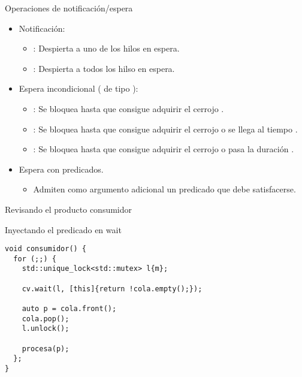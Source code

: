 \begin{frame}{Operaciones de notificación/espera}
\begin{itemize}
  \item Notificación:
    \begin{itemize}
      \item {}: Despierta a uno de los hilos en espera.
      \item {}: Despierta a todos los hilso en espera.
    \end{itemize}
  \item Espera incondicional ( de tipo ):
    \begin{itemize}
      \item {}: Se bloquea hasta que consigue adquirir el cerrojo .
      \item {}: Se bloquea hasta que consigue adquirir el cerrojo  o se llega al tiempo .
      \item {}: Se bloquea hasta que consigue adquirir el cerrojo  o pasa la duración .
    \end{itemize}
  \item Espera con predicados.
    \begin{itemize}
      \item Admiten como argumento adicional un predicado que debe satisfacerse.
    \end{itemize}
\end{itemize}
\end{frame}

\begin{frame}[fragile]{Revisando el producto consumidor}
\begin{block}{Inyectando el predicado en wait}
\begin{lstlisting}
void consumidor() {
  for (;;) {
    std::unique_lock<std::mutex> l{m};

    cv.wait(l, [this]{return !cola.empty();});

    auto p = cola.front();
    cola.pop();
    l.unlock();
   
    procesa(p);
  };
}
\end{lstlisting}
\end{block}
\end{frame}


